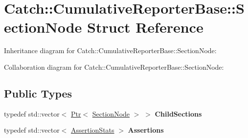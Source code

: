 \hypertarget{structCatch_1_1CumulativeReporterBase_1_1SectionNode}{}\section{Catch\+:\+:Cumulative\+Reporter\+Base\+:\+:Section\+Node Struct Reference}
\label{structCatch_1_1CumulativeReporterBase_1_1SectionNode}


Inheritance diagram for Catch\+:\+:Cumulative\+Reporter\+Base\+:\+:Section\+Node\+:


Collaboration diagram for Catch\+:\+:Cumulative\+Reporter\+Base\+:\+:Section\+Node\+:
\subsection*{Public Types}
\begin{DoxyCompactItemize}
\item 
typedef std\+::vector$<$ \hyperlink{classCatch_1_1Ptr}{Ptr}$<$ \hyperlink{structCatch_1_1CumulativeReporterBase_1_1SectionNode}{Section\+Node} $>$ $>$ {\bfseries Child\+Sections}\hypertarget{structCatch_1_1CumulativeReporterBase_1_1SectionNode_adb1744ebcada97d26047ecbdc2d55dd6}{}\label{structCatch_1_1CumulativeReporterBase_1_1SectionNode_adb1744ebcada97d26047ecbdc2d55dd6}

\item 
typedef std\+::vector$<$ \hyperlink{structCatch_1_1AssertionStats}{Assertion\+Stats} $>$ {\bfseries Assertions}\hypertarget{structCatch_1_1CumulativeReporterBase_1_1SectionNode_a55613e2ef8a65bb1fc1f53504ffecb18}{}\label{structCatch_1_1CumulativeReporterBase_1_1SectionNode_a55613e2ef8a65bb1fc1f53504ffecb18}

\end{DoxyCompactItemize}

